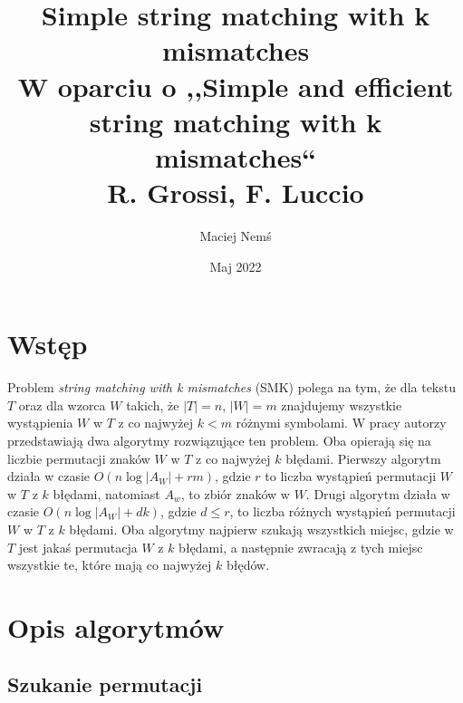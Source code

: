 \documentclass[a4paper,11pt]{article}
\title{Simple string matching with k mismatches \\ \large W oparciu o ,,Simple and efficient string matching with k mismatches“\\ R. Grossi, F. Luccio}
\author{Maciej Nemś}
\date{Maj 2022}
\begin{document}
\maketitle

\section{Wstęp}
Problem \textit{string matching with k mismatches} (SMK) polega na tym, że dla tekstu $T$ oraz dla wzorca $W$ takich, że $|T| = n$, $|W| = m$ znajdujemy wszystkie wystąpienia $W$ w $T$ z co najwyżej $k < m$ różnymi symbolami. W pracy autorzy przedstawiają dwa algorytmy rozwiązujące ten problem. Oba opierają się na liczbie permutacji znaków $W$ w $T$ z co najwyżej $k$ błędami. Pierwszy algorytm działa w czasie $O(n\log|A_W|+rm)$, gdzie $r$ to liczba wystąpień permutacji $W$ w $T$ z $k$ błędami, natomiast $A_w$, to zbiór znaków w $W$. Drugi algorytm działa w czasie $O(n\log|A_W| +dk)$, gdzie $d \leq r$, to liczba różnych wystąpień permutacji $W$ w $T$ z $k$ błędami. Oba algorytmy najpierw szukają wszystkich miejsc, gdzie w $T$ jest jakaś permutacja $W$ z $k$ błędami, a następnie zwracają z tych miejsc wszystkie te, które mają co najwyżej $k$ błędów.

\section{Opis algorytmów}

\subsection{Szukanie permutacji}
\end{document}
